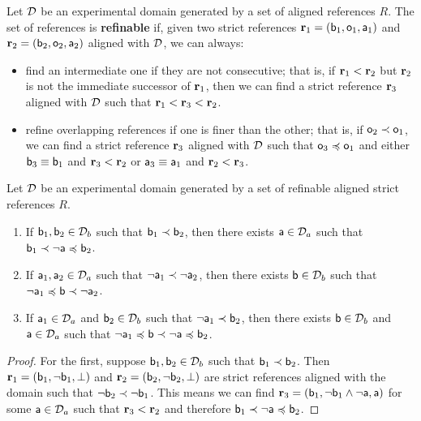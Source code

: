 \begin{mathSection}
	\begin{defn}
		Let $\edomain$ be an experimental domain generated by a set of aligned references $R$. The set of references is \textbf{refinable} if, given two strict references $\refStmt_1 = ( \stmt[b]_1, \stmt[o]_1, \stmt[a]_1)$ and $\refStmt_2 = ( \stmt[b]_2, \stmt[o]_2, \stmt[a]_2)$ aligned with $\edomain$, we can always:
		\begin{itemize}
			\item find an intermediate one if they are not consecutive; that is, if $\refStmt[r]_1 < \refStmt[r]_2$ but $\refStmt[r]_2$ is not the immediate successor of $\refStmt[r]_1$, then we can find a strict reference $\refStmt_3$ aligned with $\edomain$ such that $\refStmt[r]_1 < \refStmt[r]_3 < \refStmt[r]_2$.
			\item refine overlapping references if one is finer than the other; that is, if $\stmt[o]_2 \snarrower \stmt[o]_1$, we can find a strict reference $\refStmt_3$ aligned with $\edomain$ such that $\stmt[o]_3 \narrower \stmt[o]_1$ and either $\stmt[b]_3 \equiv \stmt[b]_1$ and $\refStmt_3 < \refStmt_2$ or $\stmt[a]_3 \equiv \stmt[a]_1$ and $\refStmt_2 < \refStmt_3$.
		\end{itemize}
	\end{defn}
	
	\begin{prop}\label{pm-pq-refinableOrderSequences}
		Let $\edomain$ be an experimental domain generated by a set of refinable aligned strict references $R$.
		\begin{enumerate}
			\item If $\stmt[b]_1, \stmt[b]_2 \in \edomain_b$ such that $\stmt[b]_1 \snarrower \stmt[b]_2$, then there exists $\stmt[a] \in \edomain_a$ such that $\stmt[b]_1 \snarrower \NOT \stmt[a] \narrower \stmt[b]_2$.
			\item If $\stmt[a]_1, \stmt[a]_2 \in \edomain_a$ such that $\NOT \stmt[a]_1 \snarrower \NOT \stmt[a]_2$, then there exists $\stmt[b] \in \edomain_b$ such that $\NOT \stmt[a]_1 \narrower \stmt[b] \snarrower \NOT \stmt[a]_2$.
			\item If $\stmt[a]_1 \in \edomain_a$ and $\stmt[b]_2\in \edomain_b$ such that $\NOT \stmt[a]_1 \snarrower \stmt[b]_2$, then there exists $\stmt[b] \in \edomain_b$ and $\stmt[a] \in \edomain_a$ such that $\NOT \stmt[a]_1 \narrower \stmt[b] \snarrower \NOT \stmt[a] \narrower \stmt[b]_2$.
		\end{enumerate}
	\end{prop}
	\begin{proof}
		For the first, suppose $\stmt[b]_1, \stmt[b]_2 \in \edomain_b$ such that $\stmt[b]_1 \snarrower \stmt[b]_2$. Then $\refStmt_1 = ( \stmt[b]_1, \NOT \stmt[b]_1, \impossibility )$ and  $\refStmt_2 = ( \stmt[b]_2, \NOT \stmt[b]_2, \impossibility)$ are strict references aligned with the domain such that $\NOT \stmt[b]_2 \snarrower \NOT \stmt[b]_1$. This means we can find $\refStmt_3 = ( \stmt[b]_1, \NOT \stmt[b]_1 \AND \NOT \stmt[a], \stmt[a] )$ for some $\stmt[a] \in \edomain_a$ such that $\refStmt_3 < \refStmt_2$ and therefore $\stmt[b]_1 \snarrower \NOT \stmt[a] \narrower \stmt[b]_2$.
		

\end{proof}
\end{mathSection}
